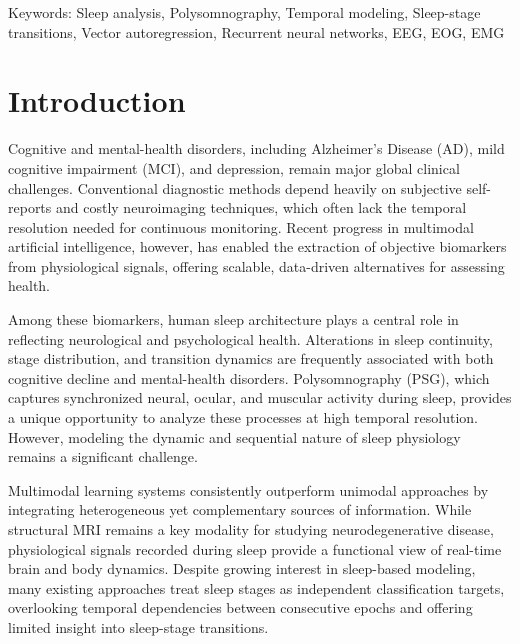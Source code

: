\documentclass[10pt]{cai26}
\begin{document}
\begin{keywords}{Keywords:}
Sleep analysis, Polysomnography, Temporal modeling, Sleep-stage transitions, Vector autoregression, Recurrent neural networks, EEG, EOG, EMG
\end{keywords}
\copyrightnotice

\section{Introduction}

Cognitive and mental-health disorders, including Alzheimer's Disease (AD), mild cognitive impairment (MCI), and depression, remain major global clinical challenges. Conventional diagnostic methods depend heavily on subjective self-reports and costly neuroimaging techniques, which often lack the temporal resolution needed for continuous monitoring. Recent progress in multimodal artificial intelligence, however, has enabled the extraction of objective biomarkers from physiological signals, offering scalable, data-driven alternatives for assessing health.

Among these biomarkers, human sleep architecture plays a central role in reflecting neurological and psychological health. Alterations in sleep continuity, stage distribution, and transition dynamics are frequently associated with both cognitive decline and mental-health disorders. Polysomnography (PSG), which captures synchronized neural, ocular, and muscular activity during sleep, provides a unique opportunity to analyze these processes at high temporal resolution. However, modeling the dynamic and sequential nature of sleep physiology remains a significant challenge.

Multimodal learning systems consistently outperform unimodal approaches by integrating heterogeneous yet complementary sources of information. While structural MRI remains a key modality for studying neurodegenerative disease, physiological signals recorded during sleep provide a functional view of real-time brain and body dynamics. Despite growing interest in sleep-based modeling, many existing approaches treat sleep stages as independent classification targets, overlooking temporal dependencies between consecutive epochs and offering limited insight into sleep-stage transitions.
\end{document}
